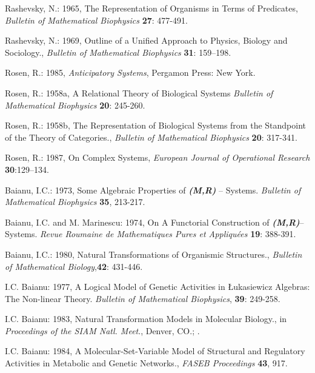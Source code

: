 \documentclass[12pt]{article}
\theoremstyle{plain}
\theoremstyle{definition}
\numberwithin{equation}{section}
\begin{document}
\begin{thebibliography}{9}

Rashevsky, N.: 1965, The Representation of Organisms in Terms of
Predicates, \emph{Bulletin of Mathematical Biophysics} \textbf{27}: 477-491.

Rashevsky, N.: 1969, Outline of a Unified Approach to Physics, Biology and Sociology., \emph{Bulletin of Mathematical Biophysics} \textbf{31}: 159--198.

Rosen, R.: 1985, \emph{Anticipatory Systems}, Pergamon Press: New York.

Rosen, R.: 1958a, A Relational Theory of Biological Systems \emph{Bulletin of Mathematical Biophysics} 
\textbf{20}: 245-260.

Rosen, R.: 1958b, The Representation of Biological Systems from the Standpoint of the 
Theory of Categories., \emph{ Bulletin of Mathematical Biophysics} \textbf{20}: 317-341.

Rosen, R.: 1987, On Complex Systems, \emph{European Journal of Operational Research} \textbf{30}:129--134.

Baianu, I.C.: 1973, Some Algebraic Properties of \emph{\textbf{(M,R)}} -- Systems. \emph{Bulletin of Mathematical Biophysics} \textbf{35}, 213-217.

Baianu, I.C. and M. Marinescu: 1974, On A Functorial Construction of \emph{\textbf{(M,R)}}-- Systems. \emph{Revue Roumaine de Mathematiques Pures et Appliqu\'ees} \textbf{19}: 388-391.

Baianu, I.C.: 1980, Natural Transformations of Organismic Structures.,
\emph{Bulletin of Mathematical Biology},\textbf{42}: 431-446.

I.C. Baianu: 1977, A Logical Model of Genetic Activities in \L{}ukasiewicz Algebras: The Non-linear Theory. \emph{Bulletin of Mathematical Biophysics}, \textbf{39}: 249-258.

I.C. Baianu: 1983, Natural Transformation Models in Molecular Biology., in \emph{Proceedings of the SIAM Natl. Meet}., Denver, CO.;  .

I.C. Baianu: 1984, A Molecular-Set-Variable Model of Structural and Regulatory Activities in Metabolic and Genetic Networks., \emph{FASEB Proceedings} \textbf{43}, 917.


\end{thebibliography}
\end{document}
